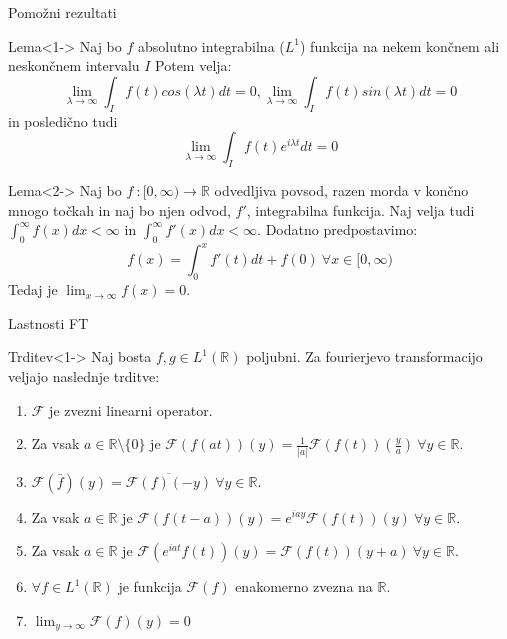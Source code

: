 \documentclass[t, 8pt]{beamer} %
\newcommand{\abs}[1]{\ensuremath{\lvert #1 \rvert}}
\newcommand{\mth}[1]{\ensuremath{\mathbb{#1}}}
\newcommand{\R}{\mth{R}}
\newcommand{\map}[3]{\ensuremath{{#1}~: {#2} \rightarrow {#3}}}
\newcommand{\fillblack}[1]{
	\begin{tikzpicture}[remember picture, overlay]
		\node [shift={(0 cm,0cm)}]  at (current page.south west)
		{%
			\begin{tikzpicture}[remember picture, overlay] at (current page.south west)
				\draw [fill=black] (0, 0) -- (0,#1 \paperheight) --
				(\paperwidth,#1 \paperheight) -- (\paperwidth,0) -- cycle ;
			\end{tikzpicture}
		};
		\draw (current page.north west) rectangle (current page.south east);
	\end{tikzpicture}
}
\begin{document}
		\begin{frame}{Pomožni rezultati}
			\begin{block}{Lema}<1->
				Naj bo $f$ absolutno integrabilna ($L^1$) funkcija na nekem končnem ali neskončnem intervalu $I$ Potem velja: $$\lim_{\lambda\to\infty}\int_I f(t)cos(\lambda t)dt = 0, \lim_{\lambda\to\infty}\int_I f(t)sin(\lambda t)dt = 0$$ in posledično tudi $$\lim_{\lambda\to\infty}\int_I f(t)e^{i\lambda t}dt = 0$$
			\end{block}
			\begin{block}{Lema}<2->
				Naj bo $\map{f}{[0, \infty)}{\R}$ odvedljiva povsod, razen morda v končno mnogo točkah in naj bo njen odvod, $f'$, integrabilna funkcija. Naj velja tudi $\int_0^\infty f(x)dx < \infty$ in $\int_0^\infty f'(x)dx < \infty$. Dodatno predpostavimo: $$f(x) = \int_{0}^{x} f'(t)dt + f(0) ~\forall x\in [0,\infty)$$ Tedaj je $\lim_{x\to\infty}f(x) = 0$.
			\end{block}
		\end{frame}
		
		\begin{frame}{Lastnosti FT}
			\begin{block}{Trditev}<1->
				Naj bosta $f, g\in L^1(\R)$ poljubni. Za fourierjevo transformacijo veljajo naslednje trditve: \begin{enumerate}
					\item $\mathcal{F}$ je zvezni linearni operator.
					\item Za vsak $a\in\R\setminus\{0\}$ je $\mathcal{F}(f(at))(y) = \frac{1}{\abs{a}}\mathcal{F}(f(t))(\frac{y}{a})~\forall y\in\R$.
					\item $\mathcal{F}(\bar{f})(y) = \overline{\mathcal{F}(f)(-y)}~\forall y\in\R$.
					\item Za vsak $a\in\R$ je $\mathcal{F}(f(t-a))(y)= e^{iay}\mathcal{F}(f(t))(y)~\forall y\in\R$.
					\item Za vsak $a\in\R$ je $\mathcal{F}(e^{iat}f(t))(y) = \mathcal{F}(f(t))(y+a)~\forall y\in\R$.
					\item $\forall f\in L^1(\R)$ je funkcija $\mathcal{F}(f)$ enakomerno zvezna na $\R$.
					\item $\lim_{y\to\infty}\mathcal{F}(f)(y) = 0$
				\end{enumerate}
			\end{block}
		\end{frame}
		
\end{document}

